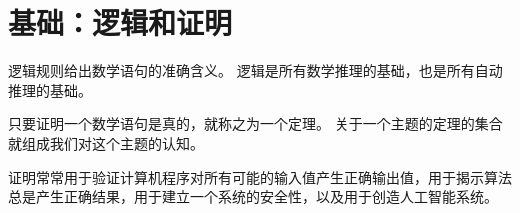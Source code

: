 \chapter{基础：逻辑和证明}
{
    逻辑规则给出数学语句的准确含义。
    逻辑是所有数学推理的基础，也是所有自动推理的基础。

    只要证明一个数学语句是真的，就称之为一个定理。
    关于一个主题的定理的集合就组成我们对这个主题的认知。

    证明常常用于验证计算机程序对所有可能的输入值产生正确输出值，用于揭示算法总是产生正确结果，用于建立一个系统的安全性，以及用于创造人工智能系统。

    
    
}

\cleardoublepage

\endinput
